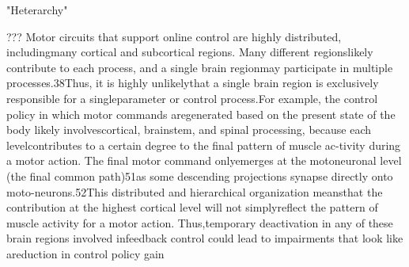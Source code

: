 






"Heterarchy"


???
Motor circuits that support online control are highly distributed, includingmany cortical and subcortical regions. Many different regionslikely contribute to each process, and a single brain regionmay participate in multiple processes.38Thus, it is highly unlikelythat a single brain region is exclusively responsible for a singleparameter or control process.For example, the control policy in which motor commands aregenerated based on the present state of the body likely involvescortical, brainstem, and spinal processing, because each levelcontributes to a certain degree to the final pattern of muscle ac-tivity during a motor action. The final motor command onlyemerges at the motoneuronal level (the final common path)51as some descending projections synapse directly onto moto-neurons.52This distributed and hierarchical organization meansthat the contribution at the highest cortical level will not simplyreflect the pattern of muscle activity for a motor action. Thus,temporary deactivation in any of these brain regions involved infeedback control could lead to impairments that look like areduction in control policy gain

